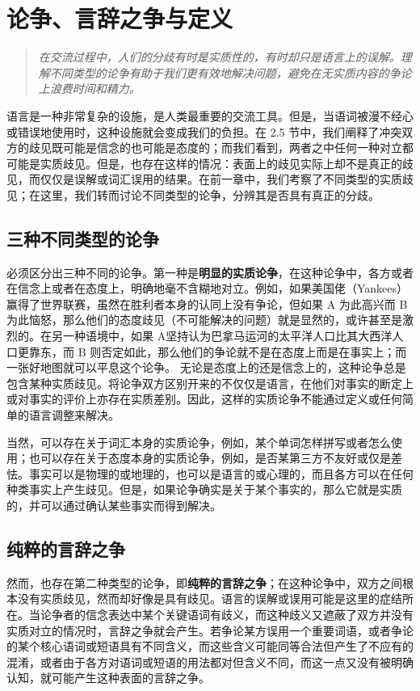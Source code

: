 \section{论争、言辞之争与定义}

\begin{quotation}
\textit{在交流过程中，人们的分歧有时是实质性的，有时却只是语言上的误解。理解不同类型的论争有助于我们更有效地解决问题，避免在无实质内容的争论上浪费时间和精力。}
\end{quotation}

语言是一种非常复杂的设施，是人类最重要的交流工具。但是，当语词被漫不经心或错误地使用时，这种设施就会变成我们的负担。在 2.5 节中，我们阐释了冲突双方的歧见既可能是信念的也可能是态度的；而我们看到，两者之中任何一种对立都可能是实质歧见。但是，也存在这样的情况：表面上的歧见实际上却不是真正的歧见，而仅仅是误解或词汇误用的结果。在前一章中，我们考察了不同类型的实质歧见；在这里，我们转而讨论不同类型的论争，分辨其是否具有真正的分歧。

\subsection{三种不同类型的论争}

必须区分出三种不同的论争。第一种是\textbf{明显的实质论争}，在这种论争中，各方或者在信念上或者在态度上，明确地毫不含糊地对立。例如，如果美国佬（Yankees）赢得了世界联赛，虽然在胜利者本身的认同上没有争论，但如果 A 为此高兴而 B 为此恼怒，那么他们的态度歧见（不可能解决的问题）就是显然的，或许甚至是激烈的。在另一种语境中，如果 A坚持认为巴拿马运河的太平洋人口比其大西洋人口更靠东，而 B 则否定如此，那么他们的争论就不是在态度上而是在事实上；而一张好地图就可以平息这个论争。 无论是态度上的还是信念上的，这种论争总是包含某种实质歧见。将论争双方区别开来的不仅仅是语言，在他们对事实的断定上或对事实的评价上亦存在实质差别。因此，这样的实质论争不能通过定义或任何简单的语言调整来解决。

当然，可以存在关于词汇本身的实质论争，例如，某个单词怎样拼写或者怎么使用；也可以存在关于态度本身的实质论争，例如，是否某第三方不友好或仅是差怯。事实可以是物理的或地理的，也可以是语言的或心理的，而且各方可以在任何种类事实上产生歧见。但是，如果论争确实是关于某个事实的，那么它就是实质的，并可以通过确认某些事实而得到解决。

\subsection{纯粹的言辞之争}

然而，也存在第二种类型的论争，即\textbf{纯粹的言辞之争}；在这种论争中，双方之间根本没有实质歧见，然而却好像是具有歧见。语言的误解或误用可能是这里的症结所在。当论争者的信念表达中某个关键语词有歧义，而这种歧义又遮蔽了双方并没有实质对立的情况时，言辞之争就会产生。若争论某方误用一个重要词语，或者争论的某个核心语词或短语具有不同含义，而这些含义可能同等合法但产生了不应有的混淆，或者由于各方对语词或短语的用法都对但含义不同，而这一点又没有被明确认知，就可能产生这种表面的言辞之争。

